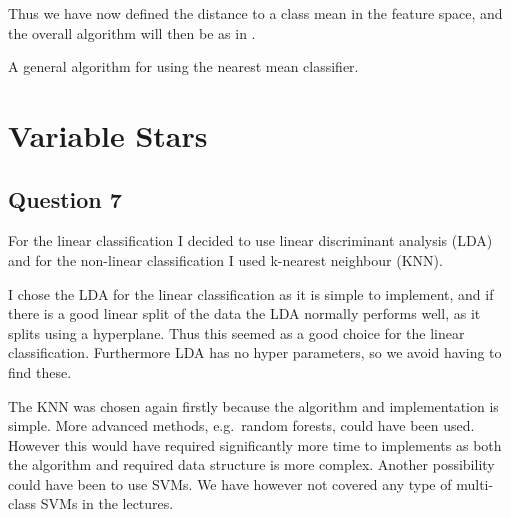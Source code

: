 \documentclass[a4paper, 11pt]{article}
\begin{document}
Thus we have now defined the distance to a class mean in the feature space, and the overall algorithm will then be as in .

\begin{algorithm}[H]
\caption{A general algorithm for using the nearest mean classifier.}
\label{alg:classmean}
\begin{algorithmic}[1]
    \EndFor{}
        \EndFor{}
    \EndFor{}
\end{algorithmic}
\end{algorithm}


\section{Variable Stars} %
\label{sec:variable_stars}

\subsection*{Question 7}

For the linear classification I decided to use linear discriminant analysis (LDA) and for the non-linear classification I used k-nearest neighbour (KNN).

I chose the LDA for the linear classification as it is simple to implement, and if there is a good linear split of the data the LDA normally performs well, as it splits using a hyperplane. Thus this seemed as a good choice for the linear classification. Furthermore LDA has no hyper parameters, so we avoid having to find these.

The KNN was chosen again firstly because the algorithm and implementation is simple. More advanced methods, e.g.\ random forests, could have been used. However this would have required significantly more time to implements as both the algorithm and required data structure is more complex. Another possibility could have been to use SVMs. We have however not covered any type of multi-class SVMs in the lectures.
\end{document}
